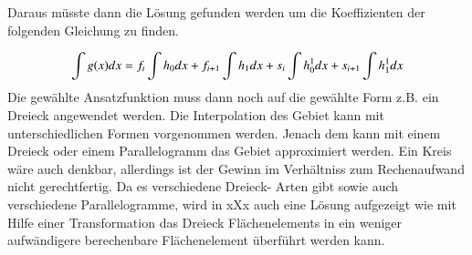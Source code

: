 


 




Daraus müsste dann die Lösung gefunden werden um die Koeffizienten der folgenden Gleichung zu finden.

\begin{equation}
\int g(x) \space dx = f_i \int h_0 \space dx+ f_{i+1}\int h_1 \space dx + s_i\int h_0^1 dx + s_{i+1}\int h_1^1 dx
\label{fem:equation5}
\end{equation}
Die gewählte Ansatzfunktion muss dann noch auf die gewählte Form z.B. ein Dreieck angewendet werden. Die Interpolation des Gebiet kann mit unterschiedlichen Formen vorgenommen werden. Jenach dem kann mit einem Dreieck oder einem Parallelogramm das Gebiet approximiert werden. Ein Kreis wäre auch denkbar, allerdings ist der Gewinn im Verhältniss zum Rechenaufwand nicht gerechtfertig. Da es verschiedene Dreieck- Arten gibt sowie auch verschiedene Parallelogramme, wird in xXx auch eine Lösung aufgezeigt wie mit Hilfe einer Transformation das Dreieck Flächenelements in ein weniger aufwändigere berechenbare Flächenelement überführt werden kann.





